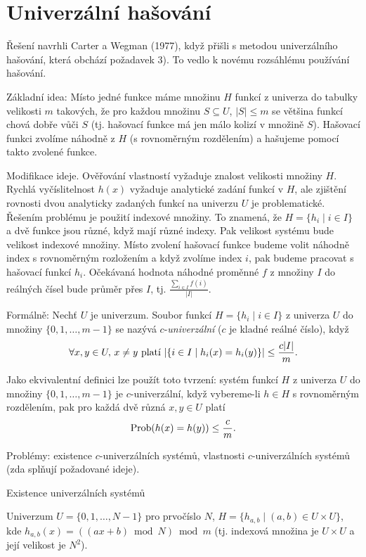 \documentclass[a4paper,12pt]{article}
\begin{document}
\section{Univerzální hašování}

Řešení navrhli Carter a Wegman (1977), když přišli s 
metodou univerzálního hašování, která obchází poža\-davek 3).  
To vedlo k novému rozsáhlému používání hašování.  

Základní idea: Místo jedné funkce máme 
množinu $H$ funkcí z univerza do tabulky velikosti $m$ 
takových, že pro každou množinu $S\subseteq U$, $|S|\le 
m$ se 
většina funkcí chová dobře vůči $S$ (tj. hašovací funkce má jen málo kolizí v množině $S$). 
Hašovací funkci 
zvolíme náhodně z $H$ (s rovnoměrným rozdělením) a hašujeme  
pomocí takto zvo\-lené funkce. 

Modifikace ideje. Ověřování vlastností vyžaduje 
znalost velikosti množiny $H$. Rychlá vyčíslitelnost $
h(x)$ 
vyžaduje ana\-lytické zadání funkcí v $H$, ale zjištění rovnosti 
dvou analy\-ticky zadaných funkcí na univerzu $U$ je 
problematické. Řešením problému je použití indexové množiny. 
To znamená, že $H=\{h_i\mid i\in I\}$ a dvě funkce jsou různé, 
když mají různé indexy. Pak velikost systému bude 
velikost indexové množiny. Místo zvolení hašovací funkce 
budeme volit náhodně index s rovnoměrným rozložením a když 
zvolíme index $i$, pak budeme pracovat s hašovací funkcí $
h_i$. 
Očekávaná hodnota náhodné proměnné $f$ z množiny $
I$ do 
reálných čísel bude průměr přes $I$, tj. $\frac {
\sum_{i\in I}f(i)}{|I|}$.

Formálně: Nech\v t  $U$ je univerzum. Soubor  
funkcí $H=\{h_i\mid i\in I\}$ z univerza $U$ do množiny $\{
0,1,\dots,m-1\}$ se 
nazývá $c$-\emph{univerzální} ($c$ je kladné reálné číslo), 
když 
$$\forall x,y\in U,\,x\ne y\text{\rm\ platí }|\{i\in I\mid h_
i(x)=h_i(y)\}|\le\frac {c|I|}m.$$

Jako ekvivalentní definici lze použít toto tvrzení: systém funkcí $
H$ z univerza $U$ do množiny $\{0,1,\dots,m-1\}$ je $c$-univerzální,
když vybereme-li $h\in H$ s rovnoměrným rozděle\-ním, pak pro 
každá dvě různá $x,y\in U$ platí 
$$\operatorname{Prob}(h(x)=h(y))\le\frac cm.$$

Problémy: existence $c$-univerzálních 
systémů, \newline 
vlastnosti $c$-univerzálních systémů (zda splňují 
požadované ide\-je).

\subhead
Existence univerzálních systémů
\endsubhead

Univerzum $U=\{0,1,\dots,N-1\}$ pro prvočíslo $N$,\newline 
$H=\{h_{a,b}\mid (a,b)\in U\times U\}$,\newline 
kde $h_{a,b}(x)=((ax+b)\bmod N)\bmod m$\newline 
(tj. indexová množina je $U\times U$ a její velikost je $
N^2$).
\end{document}
